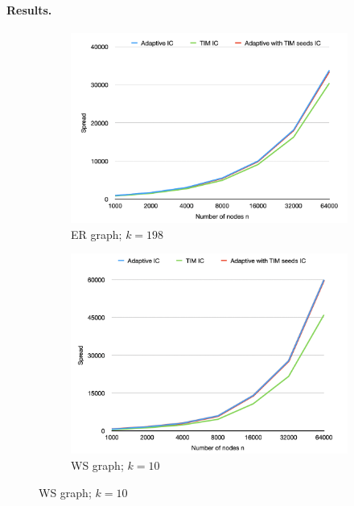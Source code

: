 \paragraph{Results.}


        
\begin{figure}
\centering
\begin{subfigure}{0.4\textwidth}
    \includegraphics[width=1\linewidth]{GSSI_thesisProposal/figures/ER_IC.png}
    \caption{ER graph; $k=198$}
    \label{fig:first}
\end{subfigure}
\hfill
\begin{subfigure}{0.4\textwidth}
    \includegraphics[width=1\linewidth]{GSSI_thesisProposal/figures/WS_IC.png}
    \caption{WS graph; $k=10$}
    \label{fig:second}
\end{subfigure}

\end{figure}
